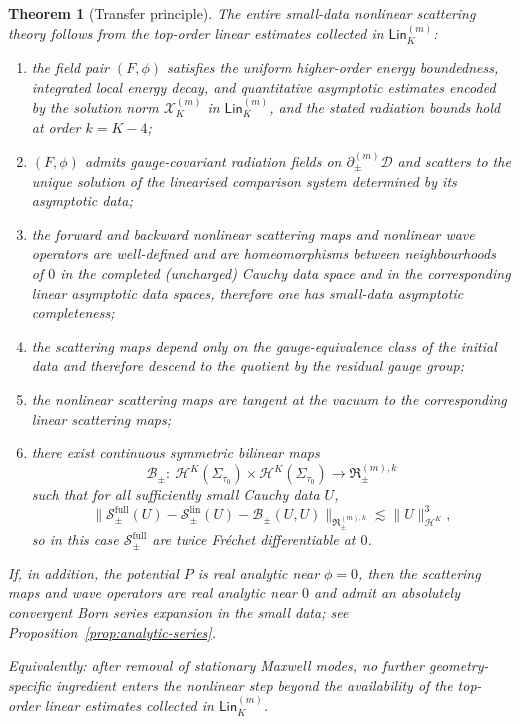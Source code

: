\documentclass[11pt]{article}
\numberwithin{equation}{section}
\theoremstyle{plain}
\newtheorem{theorem}{Theorem}[section]
\theoremstyle{definition}
\theoremstyle{remark}
\newcommand{\Lin}{\mathsf{Lin}}
\begin{document}
\begin{theorem}[Transfer principle]
The entire small-data nonlinear scattering theory follows from the top-order linear estimates collected in $\Lin_{K}^{(m)}$:
\begin{enumerate}
\item the field pair $(F,\phi)$ satisfies the uniform higher-order energy boundedness, integrated local energy decay, and quantitative asymptotic estimates encoded by the solution norm $\mathcal X_{K}^{(m)}$ in $\Lin_{K}^{(m)}$, and the stated radiation bounds hold at order $k=K-4$;
\item $(F,\phi)$ admits gauge-covariant radiation fields on $\partial_{\pm}^{(m)}\mathcal D$ and scatters to the unique solution of the linearised comparison system determined by its asymptotic data;
\item the forward and backward nonlinear scattering maps and nonlinear wave operators are well-defined and are homeomorphisms between neighbourhoods of $0$ in the completed (uncharged) Cauchy data space and in the corresponding linear asymptotic data spaces, therefore one has small-data asymptotic completeness;
\item the scattering maps depend only on the gauge-equivalence class of the initial data and therefore descend to the quotient by the residual gauge group;
\item the nonlinear scattering maps are tangent at the vacuum to the corresponding linear scattering maps;
\item there exist continuous symmetric bilinear maps
\begin{equation}
\mathscr B_{\pm}:\ \mathcal H^{K}(\Sigma_{\tau_{0}})\times\mathcal H^{K}(\Sigma_{\tau_{0}})\longrightarrow \mathfrak R_{\pm}^{(m),k}
\end{equation}
such that for all sufficiently small Cauchy data $U$,
\begin{equation}
\bigl\|\mathscr S_{\pm}^{\mathrm{full}}(U)-\mathscr S_{\pm}^{\mathrm{lin}}(U)-\mathscr B_{\pm}(U,U)\bigr\|_{\mathfrak R_{\pm}^{(m),k}}\lesssim \|U\|_{\mathcal H^{K}}^{3},
\end{equation}
so in this case $\mathscr S_{\pm}^{\mathrm{full}}$ are twice Fr\'echet differentiable at $0$.
\end{enumerate}

If, in addition, the potential $P$ is real analytic near $\phi=0$, then the scattering maps and wave operators are real analytic near $0$ and admit an absolutely convergent Born series expansion in the small data; see Proposition~\ref{prop:analytic-series}.

Equivalently: after removal of stationary Maxwell modes, no further geometry-specific ingredient enters the nonlinear step beyond the availability of the top-order linear estimates collected in $\Lin_{K}^{(m)}$.
\end{theorem}
\end{document}
